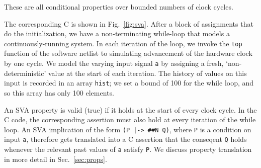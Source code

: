 \noindent These are all conditional properties over bounded numbers of clock cycles. 
 
The corresponding C is shown in Fig.~\ref{fig:sva}. After a block of assignments that do the initialization, we have a non-terminating while-loop that models a continuously-running system. In each iteration of the loop, we invoke the \texttt{top} function of the software netlist to simulating advancement of the hardware clock by one cycle.   We model the varying input signal \texttt{a} by assigning a fresh, `non-deterministic' value at the start of each iteration. The history of values on this input is recorded in an array \texttt{hist}; we set a bound of 100 for the while loop, and so this array has only 100 elements. 

An SVA property is valid (true) if it holds at the start  of every clock cycle. In the C code, the corresponding assertion must also hold at every iteration of the while loop. An SVA implication of the form \texttt{(P |-> \#\#N Q)}, where \texttt{P} is a condition on input \texttt{a}, therefore gets translated into a C assertion that the conseqent \texttt{Q} holds whenever the relevant past values of \texttt{a} satisfy \texttt{P}. We discuss property translation in more detail in Sec.~\ref{sec:props}.

